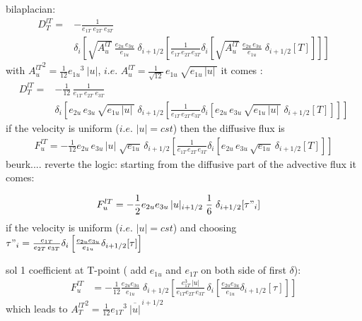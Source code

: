 bilaplacian:
\begin{equation} \label{Eq_tra_ldf_lap}
\begin{split}
D_T^{lT} =&-\frac{1}{e_{1T} \; e_{2T}\;  e_{3T}} \\
& \delta _i \left[  \sqrt{A_u^{lT}}\ \frac{e_{2u}\,e_{3u}}{e_{1u}}\;\delta _{i+1/2} 
		  \left[ \frac{1}{e_{1T}\,e_{2T}\, e_{3T}}
    \delta _i \left[ \sqrt{A_u^{lT}}\ \frac{e_{2u}\,e_{3u}}{e_{1u}}\;\delta _{i+1/2} 
    		  [T] \right] \right] \right]
\end{split}
\end{equation}
with ${A_u^{lT}}^2 = \frac{1}{12} {e_{1u}}^3\ |u|$, 
$i.e.$ $A_u^{lT} = \frac{1}{\sqrt{12}} \,e_{1u}\ \sqrt{ e_{1u}\,|u|\,}$
it comes :
\begin{equation} \label{Eq_tra_ldf_lap}
\begin{split}
D_T^{lT} =&-\frac{1}{12}\,\frac{1}{e_{1T} \; e_{2T}\;  e_{3T}} \\
& \delta _i \left[ e_{2u}\,e_{3u}\,\sqrt{ e_{1u}\,|u|\,}\;\delta _{i+1/2} 
		 \left[ \frac{1}{e_{1T}\,e_{2T}\, e_{3T}} 
    \delta _i \left[ e_{2u}\,e_{3u}\,\sqrt{ e_{1u}\,|u|\,}\;\delta _{i+1/2} 
    		[T] \right] \right] \right]
\end{split}
\end{equation}
if the velocity is uniform ($i.e.$ $|u|=cst$) then the diffusive flux is
\begin{equation} \label{Eq_tra_ldf_lap}
\begin{split}
F_u^{lT} = - \frac{1}{12}
 e_{2u}\,e_{3u}\,|u| \;\sqrt{ e_{1u}}\,\delta _{i+1/2} 
		 \left[ \frac{1}{e_{1T}\,e_{2T}\, e_{3T}} 
    \delta _i \left[ e_{2u}\,e_{3u}\,\sqrt{ e_{1u}}\:\delta _{i+1/2} 
    		[T] \right] \right]
\end{split}
\end{equation}
beurk....  reverte the logic: starting from the diffusive part of the advective flux it comes:

\begin{equation} \label{Eq_tra_adv_ubs2}
\begin{split}
F_u^{lT}
&= - \frac{1}{2} e_{2u} e_{3u}\,|u|_{i+1/2} \;\frac{1}{6} \;\delta_{i+1/2}[\tau"_i]
\end{split}
\end{equation}
if the velocity is uniform ($i.e.$ $|u|=cst$) and choosing $\tau "_i =\frac{e_{1T}}{e_{2T}\,e_{3T}}\delta _i \left[ \frac{e_{2u} e_{3u} }{e_{1u} } \delta _{i+1/2}[\tau] \right]$

sol 1 coefficient at T-point ( add $e_{1u}$ and $e_{1T}$ on both side of first $\delta$):
\begin{equation} \label{Eq_tra_adv_ubs2}
\begin{split}
F_u^{lT}
&= - \frac{1}{12} \frac{e_{2u} e_{3u}}{e_{1u}}\;\delta_{i+1/2}\left[ \frac{e_{1T}^3\,|u|}{e_{1T}e_{2T}\,e_{3T}}\,\delta _i \left[ \frac{e_{2u} e_{3u} }{e_{1u} } \delta _{i+1/2}[\tau] \right] \right]
\end{split}
\end{equation}
which leads to ${A_T^{lT}}^2 = \frac{1}{12} {e_{1T}}^3\ \overline{|u|}^{\,i+1/2}$

